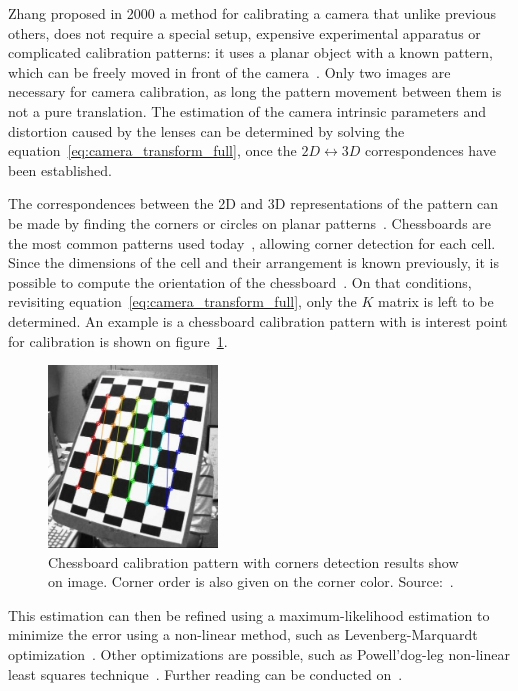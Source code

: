 Zhang proposed in 2000 a method for calibrating a camera that unlike previous others, does not require a special setup, expensive experimental apparatus or complicated calibration patterns: it uses a planar object with a known pattern, which can be freely moved in front of the camera~\cite{Zhang2000}. Only two images are necessary for camera calibration, as long the pattern movement between them is not a pure translation. The estimation of the camera intrinsic parameters and distortion caused by the lenses can be determined by solving the equation~\ref{eq:camera_transform_full}, once the $2D \leftrightarrow 3D$ correspondences have been established.

The correspondences between the 2D and 3D representations of the pattern can be made by finding the corners or circles on planar patterns~\cite{opencv, mvg_book}. Chessboards are the most common patterns used today~\cite{opencv}, allowing corner detection for each cell. Since the dimensions of the cell and their arrangement is known previously, it is possible to compute the orientation of the chessboard~\cite{Zhang2000, opencv_doc, mvg_book}. On that conditions, revisiting equation~\ref{eq:camera_transform_full}, only the $K$ matrix is left to be determined. An example is a chessboard calibration pattern with is interest point for calibration is shown on figure~\ref{fig:opencv_calib_pattern}.

\begin{figure}
	\centering
	\includegraphics[width=0.4\textwidth, keepaspectratio]{img/camera/calib_pattern.jpg}
	\caption{Chessboard calibration pattern with corners detection results show on image. Corner order is also given on the corner color. Source:~\cite{OpenCV_camera_calib}.}
	\label{fig:opencv_calib_pattern}
\end{figure}

This estimation can then be refined using a maximum-likelihood estimation to minimize the error using a non-linear method, such as Levenberg-Marquardt optimization~\cite{Levenberg1943}. Other optimizations are possible, such as Powell’dog-leg non-linear least squares technique~\cite{Lourakis2005}. Further reading can be conducted on~\cite{mvg_book, Sturm2010, camera_models, Hata, Xu1996a}.

